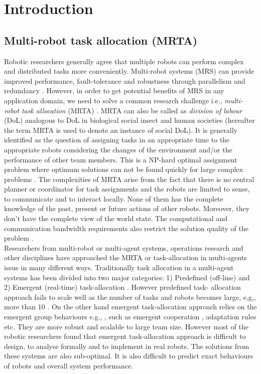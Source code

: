 \chapter{Introduction}
\section{Multi-robot task allocation (MRTA)}
Robotic researchers generally agree that multiple robots can perform complex and distributed tasks more conveniently. Multi-robot systems (MRS) can provide improved performance, fault-tolerance and robustness through parallelism and redundancy \cite{Arkin1998,Parker+2006,Mataric2007}. However, in order to get potential benefits of MRS in any application domain, we need to solve a common research challenge i.e., \textit{multi-robot task allocation} (MRTA) \cite{Gerkey+2004}. MRTA can also be called as \textit{division of labour} (DoL) analogous to DoL in biological social insect and human societies (hereafter the term MRTA is used to denote an instance of social DoL). It is generally identified as the question of assigning tasks in an appropriate time to the appropriate robots considering the changes of the environment and/or the performance of other team members. This is a NP-hard optimal assignment problem where optimum solutions can not be found quickly for large complex problems \cite{Gerkey+2003,Parker2008}.
%
The complexities of MRTA arise from the fact that there is no central planner or coordinator for task assignments and the robots are limited to sense, to communicate and to interact locally. None of them has the complete knowledge of the past, present or future actions of other robots. Moreover, they don't have the complete view of the world state. The computational and communication bandwidth requirements also restrict the solution quality of the problem \cite{Lerman+2006}.\\
% 
Researchers from multi-robot or multi-agent systems, operations research and other disciplines have approached the MRTA or task-allocation in multi-agents issue in many different ways. Traditionally task allocation in a multi-agent systems has been divided into two major categories: 1) Predefined (off-line) and 2) Emergent (real-time) task-allocation \cite{Shen+2001}. However predefined task- allocation approach fails to scale well as the number of tasks and robots becomes large, e,g,, more than 10 \cite{Lerman+2006}. On the other hand emergent task-allocation approach relies on the emergent group behaviours e.g., \cite{Kube+1993}, such as emergent cooperation \cite{Lerman+2006}, adaptation rules \cite{Liu+2007} etc. They are more robust and scalable to large team size. However most of the robotic researchers found that emergent task-allocation approach is difficult to design, to analyse formally and to implement in real robots. The solutions from these systems are also sub-optimal. It is also difficult to predict exact behaviours of robots and overall system performance.\\
